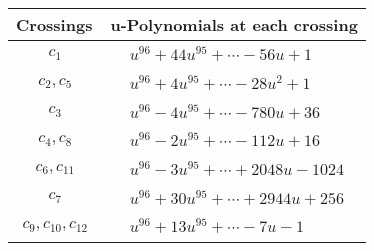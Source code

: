 \documentclass[1p]{elsarticle_modified}
\theoremstyle{definition}
\begin{document}
\begin{tabular}{m{50pt}|m{274pt}}
Crossings & \hspace{64pt}u-Polynomials at each crossing \\
\hline $$\begin{aligned}c_{1}\end{aligned}$$&$\begin{aligned}
&u^{96}+44 u^{95}+\cdots-56 u+1
\end{aligned}$\\
\hline $$\begin{aligned}c_{2},c_{5}\end{aligned}$$&$\begin{aligned}
&u^{96}+4 u^{95}+\cdots-28 u^2+1
\end{aligned}$\\
\hline $$\begin{aligned}c_{3}\end{aligned}$$&$\begin{aligned}
&u^{96}-4 u^{95}+\cdots-780 u+36
\end{aligned}$\\
\hline $$\begin{aligned}c_{4},c_{8}\end{aligned}$$&$\begin{aligned}
&u^{96}-2 u^{95}+\cdots-112 u+16
\end{aligned}$\\
\hline $$\begin{aligned}c_{6},c_{11}\end{aligned}$$&$\begin{aligned}
&u^{96}-3 u^{95}+\cdots+2048 u-1024
\end{aligned}$\\
\hline $$\begin{aligned}c_{7}\end{aligned}$$&$\begin{aligned}
&u^{96}+30 u^{95}+\cdots+2944 u+256
\end{aligned}$\\
\hline $$\begin{aligned}c_{9},c_{10},c_{12}\end{aligned}$$&$\begin{aligned}
&u^{96}+13 u^{95}+\cdots-7 u-1
\end{aligned}$\\
\hline
\end{tabular}\\~\\
\newpage\renewcommand{\arraystretch}{1}
\end{document}
